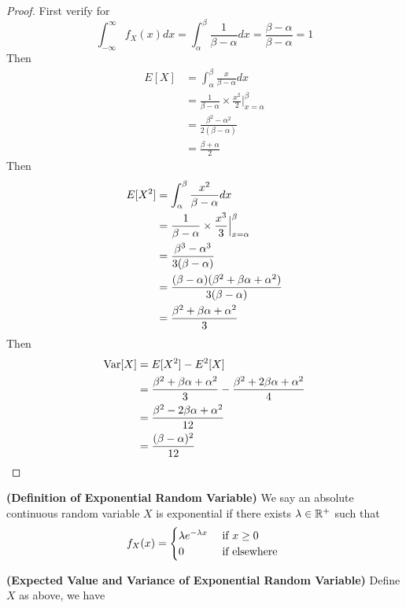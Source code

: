 \documentclass{report}
\begin{document}
\begin{proof}
First verify for
\begin{equation}
\int_{-\infty}^\infty f_X(x)dx=\int_{\alpha }^\beta \frac{1}{\beta -\alpha }dx=\frac{\beta -\alpha }{\beta -\alpha }=1
\end{equation}
Then 
\begin{align}
E[X]&=\int_{\alpha }^\beta \frac{x}{\beta -\alpha }dx\\
&=\frac{1}{\beta -\alpha }\times \frac{x^2}{2} \Big|_{x=\alpha }^\beta \\
&=\frac{\beta ^2-\alpha ^2}{2(\beta -\alpha )}\\
&=\frac{\beta +\alpha }{2}
\end{align}
Then 
\begin{align}
E[X^2]&=\int_{\alpha }^\beta \frac{x^2}{\beta -\alpha }dx\\
      &=\frac{1}{\beta -\alpha }\times \frac{x^3}{3} \Big|_{x=\alpha }^\beta\\
      &=\frac{\beta ^3-\alpha ^3}{3(\beta -\alpha )}\\
      &=\frac{(\beta -\alpha )(\beta ^2+\beta \alpha +\alpha ^2)}{3(\beta -\alpha )}\\
      &=\frac{\beta ^2+\beta \alpha +\alpha ^2}{3}
\end{align}
Then
\begin{align}
\text{Var} [X]&=E[X^2]-E^2[X]\\
&=\frac{\beta ^2+\beta \alpha +\alpha ^2}{3}-\frac{\beta ^2+2\beta \alpha +\alpha ^2}{4}\\
&=\frac{\beta^2-2\beta \alpha +\alpha ^2}{12}\\
&=\frac{(\beta -\alpha )^2}{12}
\end{align}
\end{proof}
\begin{definition}
\label{2.1.3}
\textbf{(Definition of Exponential Random Variable)} We say an absolute continuous random variable $X$ is exponential if there exists $\lambda\in\mathbb{R}^+$ such that
\begin{equation}
f_X(x)=\begin{cases}
  \lambda e^{-\lambda x}& \text{ if $x\geq 0$ }\\
  0& \text{ if elsewhere }
\end{cases}
\end{equation}
\end{definition}
\begin{theorem}
\label{2.1.4}
\textbf{(Expected Value and Variance of Exponential Random Variable)} Define $X$ as above, we have 
\end{theorem}
\end{document}
